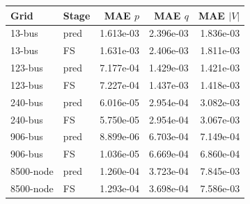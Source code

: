 \begin{tabular}{llrrr}
\toprule
Grid & Stage & MAE $p$ & MAE $q$ & MAE $|V|$ \\
\midrule
13-bus & pred & 1.613e-03 & 2.396e-03 & 1.836e-03 \\
13-bus & FS & 1.631e-03 & 2.406e-03 & 1.811e-03 \\
123-bus & pred & 7.177e-04 & 1.429e-03 & 1.421e-03 \\
123-bus & FS & 7.227e-04 & 1.437e-03 & 1.418e-03 \\
240-bus & pred & 6.016e-05 & 2.954e-04 & 3.082e-03 \\
240-bus & FS & 5.750e-05 & 2.954e-04 & 3.067e-03 \\
906-bus & pred & 8.899e-06 & 6.703e-04 & 7.149e-04 \\
906-bus & FS & 1.036e-05 & 6.669e-04 & 6.860e-04 \\
8500-node & pred & 1.260e-04 & 3.723e-04 & 7.845e-03 \\
8500-node & FS & 1.293e-04 & 3.698e-04 & 7.586e-03 \\
\bottomrule
\end{tabular}
